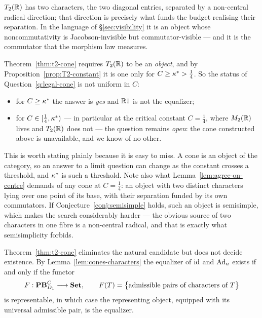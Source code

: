 \begin{remark}
$T_2(\mathbb{R})$ has two characters, the two diagonal entries, separated by a
non-central radical direction; that direction is precisely what funds the budget
realising their separation.  In the language of \S\ref{sec:visibility} it is an
object whose noncommutativity is Jacobson-invisible but commutator-visible ---
and it is the commutator that the morphism law measures.
\end{remark}

\begin{warning}\label{warn:cone-constant}
Theorem~\ref{thm:t2-cone} requires $T_2(\mathbb{R})$ to be an \emph{object}, and by
Proposition~\ref{prop:T2-constant} it is one only for $C\ge\kappa^*>\tfrac14$.  So
the status of Question~\ref{q:legal-cone} is not uniform in $C$:
\begin{itemize}
\item for $C\ge\kappa^*$ the answer is \emph{yes} and $\mathbb{R}1$ is not the equalizer;
\item for $C\in[\tfrac14,\kappa^*)$ --- in particular at the critical constant
  $C=\tfrac14$, where $M_2(\mathbb{R})$ lives and $T_2(\mathbb{R})$ does not --- the question
  remains \emph{open}: the cone constructed above is unavailable, and we know of
  no other.
\end{itemize}
This is worth stating plainly because it is easy to miss.  A cone is an object
of the category, so an answer to a limit question can change as the constant
crosses a threshold, and $\kappa^*$ is such a threshold.  Note also what
Lemma~\ref{lem:agree-on-centre} demands of any cone at $C=\tfrac14$: an object
with two distinct characters lying over one point of its base, with their
separation funded by its own commutators.  If
Conjecture~\ref{conj:semisimple} holds, such an object is semisimple, which
makes the search considerably harder --- the obvious source of two characters
in one fibre is a non-central radical, and that is exactly what
semisimplicity forbids.
\end{warning}

\begin{question}\label{q:equalizer-exists}
Theorem~\ref{thm:t2-cone} eliminates the natural candidate but does not decide
existence.  By Lemma~\ref{lem:cones-characters} the equalizer of $\operatorname{id}$ and
$\operatorname{Ad}_u$ exists if and only if the functor
\[
  F:\mathbf{PB}^C_{D_1}\longrightarrow\mathbf{Set},
  \qquad
  F(T)=\bigl\{\text{admissible pairs of characters of }T\bigr\}
\]
is representable, in which case the representing object, equipped with its
universal admissible pair, is the equalizer.
\end{question}

